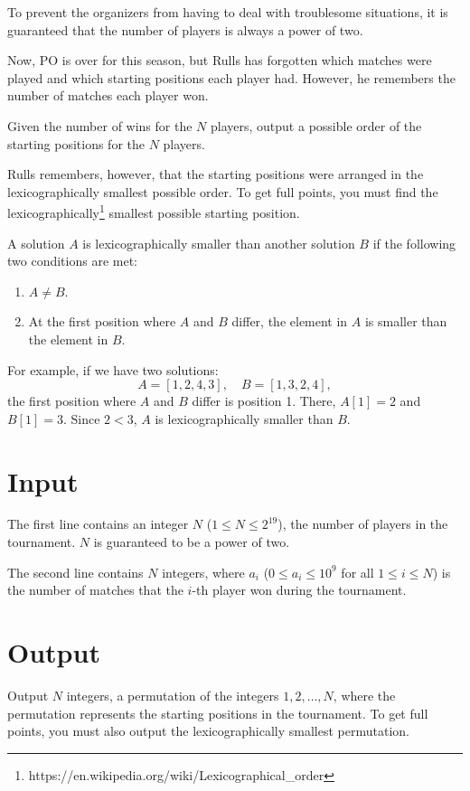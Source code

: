 To prevent the organizers from having to deal with troublesome situations, it is guaranteed that the number of players is always a power of two.

Now, PO is over for this season,  
but Rulls has forgotten which matches were played  
and which starting positions each player had.  
However, he remembers the number of matches each player won.

Given the number of wins for the $N$ players,  
output a possible order of the starting positions for the $N$ players.

Rulls remembers, however, that the starting positions were arranged in the lexicographically smallest possible order.
To get full points, you must find the lexicographically\footnote{https://en.wikipedia.org/wiki/Lexicographical\_order} smallest possible starting position.

A solution $A$ is lexicographically smaller than another solution $B$ if the following two conditions are met:  
\begin{enumerate}  
    \item $A \neq B$.  
    \item At the first position where $A$ and $B$ differ, the element in $A$ is smaller than the element in $B$.  
\end{enumerate}  

For example, if we have two solutions:  
$$
A = [1, 2, 4, 3], \quad B = [1, 3, 2, 4],  
$$  
the first position where $A$ and $B$ differ is position 1. There, $A[1] = 2$ and $B[1] = 3$. Since $2 < 3$, $A$ is lexicographically smaller than $B$.  


\section*{Input}
The first line contains an integer $N$ ($1 \leq N \leq 2^{19}$), the number of players in the tournament. $N$ is guaranteed to be a power of two.

The second line contains $N$ integers, where $a_i$ ($0 \leq a_i \leq 10^9$ for all $1 \leq i \leq N$) is the number of matches that the $i$-th player won during the tournament.

\section*{Output}
Output $N$ integers, a permutation of the integers $1, 2, \ldots, N$, where the permutation represents the starting positions in the tournament.  
To get full points, you must also output the lexicographically smallest permutation.

